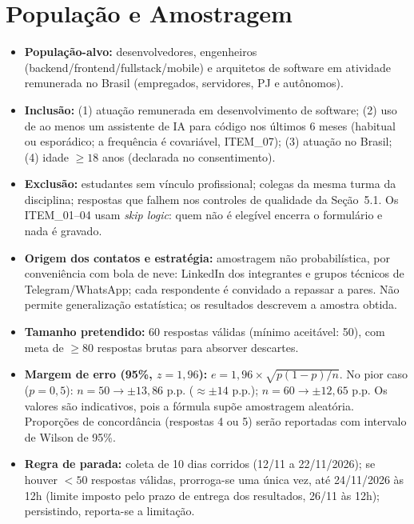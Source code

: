 \section{População e Amostragem}

\begin{itemize}
  \item \textbf{População-alvo:} desenvolvedores, engenheiros (backend/frontend/fullstack/mobile) e arquitetos de software em atividade remunerada no Brasil (empregados, servidores, PJ e autônomos).
  \item \textbf{Inclusão:} (1) atuação remunerada em desenvolvimento de software; (2) uso de ao menos um assistente de IA para código nos últimos 6 meses (habitual ou esporádico; a frequência é covariável, ITEM\_07); (3) atuação no Brasil; (4) idade $\ge 18$ anos (declarada no consentimento).
  \item \textbf{Exclusão:} estudantes sem vínculo profissional; colegas da mesma turma da disciplina; respostas que falhem nos controles de qualidade da Seção~5.1. Os ITEM\_01--04 usam \textit{skip logic}: quem não é elegível encerra o formulário e nada é gravado.
  \item \textbf{Origem dos contatos e estratégia:} amostragem não probabilística, por conveniência com bola de neve: LinkedIn dos integrantes e grupos técnicos de Telegram/WhatsApp; cada respondente é convidado a repassar a pares. Não permite generalização estatística; os resultados descrevem a amostra obtida.
  \item \textbf{Tamanho pretendido:} 60 respostas válidas (mínimo aceitável: 50), com meta de $\ge 80$ respostas brutas para absorver descartes.
  \item \textbf{Margem de erro (95\%, $z = 1{,}96$):} $e = 1{,}96 \times \sqrt{p(1 - p)/n}$. No pior caso ($p = 0{,}5$): $n = 50 \to \pm 13{,}86\text{ p.p.}$ ($\approx \pm 14\text{ p.p.}$); $n = 60 \to \pm 12{,}65\text{ p.p.}$ Os valores são indicativos, pois a fórmula supõe amostragem aleatória. Proporções de concordância (respostas 4 ou 5) serão reportadas com intervalo de Wilson de 95\%.
  \item \textbf{Regra de parada:} coleta de 10 dias corridos (12/11 a 22/11/2026); se houver $< 50$ respostas válidas, prorroga-se uma única vez, até 24/11/2026 às 12h (limite imposto pelo prazo de entrega dos resultados, 26/11 às 12h); persistindo, reporta-se a limitação.
\end{itemize}
